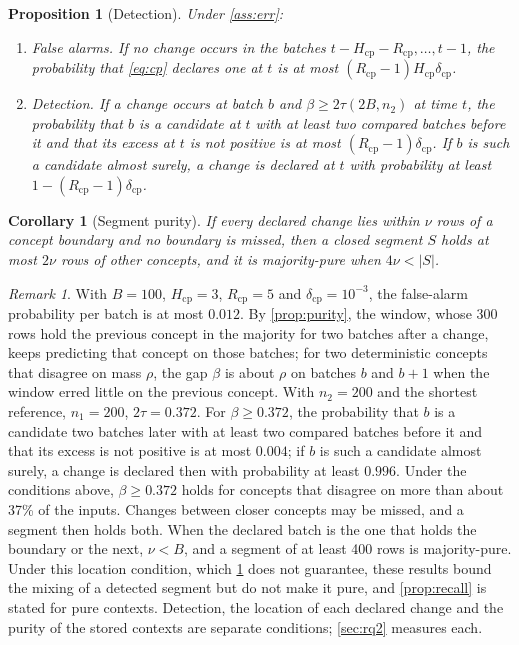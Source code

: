 \documentclass[11pt]{article}
\theoremstyle{plain}
\newtheorem{proposition}{Proposition}
\newtheorem{corollary}{Corollary}
\theoremstyle{definition}
\theoremstyle{remark}
\newtheorem{remark}{Remark}
\begin{document}
\begin{proposition}[Detection]\label{prop:cp}
Under \cref{ass:err}:
\begin{enumerate}
  \item[(i)] \emph{False alarms.} If no change occurs in the batches $t-H_{\mathrm{cp}}-R_{\mathrm{cp}},\dots,t-1$,
  the probability that \eqref{eq:cp} declares one at $t$ is at most $(R_{\mathrm{cp}}-1)H_{\mathrm{cp}}\delta_{\mathrm{cp}}$.
  \item[(ii)] \emph{Detection.} If a change occurs at batch $b$ and $\beta\ge2\tau(2B,n_2)$ at time $t$, the
  probability that $b$ is a candidate at $t$ with at least two compared batches before it and that its excess at
  $t$ is not positive is at most $(R_{\mathrm{cp}}-1)\delta_{\mathrm{cp}}$. If $b$ is such a candidate almost surely,
  a change is declared at $t$ with probability at least $1-(R_{\mathrm{cp}}-1)\delta_{\mathrm{cp}}$.
\end{enumerate}
\end{proposition}

\begin{corollary}[Segment purity]\label{cor:cp}
If every declared change lies within $\nu$ rows of a concept boundary and no boundary is missed, then a closed
segment $S$ holds at most $2\nu$ rows of other concepts, and it is majority-pure when $4\nu<|S|$.
\end{corollary}

\begin{remark}
With $B=100$, $H_{\mathrm{cp}}=3$, $R_{\mathrm{cp}}=5$ and $\delta_{\mathrm{cp}}=10^{-3}$, the false-alarm probability
per batch is at most $0.012$. By \cref{prop:purity}, the window, whose 300 rows hold the previous concept in the
majority for two batches after a change, keeps predicting that concept on those batches; for two deterministic
concepts that disagree on mass $\rho$, the gap $\beta$ is about $\rho$ on batches $b$ and $b+1$ when the window
erred little on the previous concept. With $n_2=200$ and the shortest reference, $n_1=200$, $2\tau=0.372$. For $\beta\ge0.372$, the
probability that $b$ is a candidate two batches later with at least two compared batches before it and that its
excess is not positive is at most $0.004$; if $b$ is such a candidate almost surely, a change is declared then with
probability at least $0.996$. Under the conditions above, $\beta\ge0.372$ holds for concepts that disagree on more
than about 37\% of the inputs. Changes
between closer concepts may be missed, and a segment then holds both. When the declared batch is the one that holds the boundary or the next, $\nu<B$, and a
segment of at least 400 rows is majority-pure. Under this location condition, which \cref{prop:cp} does not guarantee, these results bound the mixing of a
detected segment but do not make it pure, and \cref{prop:recall} is stated for pure contexts. Detection, the location of each declared change and
the purity of the stored contexts are separate conditions; \cref{sec:rq2} measures each.
\end{remark}
\end{document}
